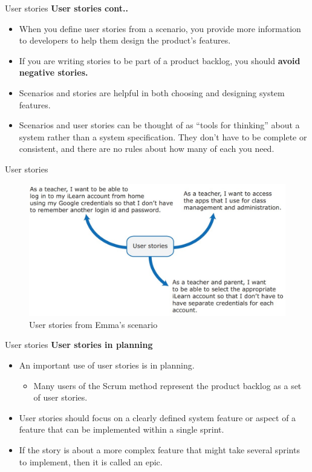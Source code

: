 \documentclass{beamer}
\begin{document}
\begin{frame}{User stories}
	\textbf{User stories cont..}
	\begin{itemize}
		\item When you define user stories from a scenario, you provide more 
		information to developers to help them design the product’s features.
		\item If you are writing stories to be part of a product backlog, you should 
	\textbf{	avoid negative stories.}
		\item Scenarios and stories are helpful in both choosing and designing 
		system features. 
		\item Scenarios and user stories can be thought of as “tools for thinking” 
		about a system rather than a system specification. They don’t have to 
		be complete or consistent, and there are no rules about how many of 
		each you need.
	\end{itemize}
\end{frame}
\begin{frame}{User stories}
		\begin{figure}
		\includegraphics[scale=.45]{img/m2_27.jpg}
		\caption{User stories from Emma’s scenario}
	\end{figure}
\end{frame}
\begin{frame}{User stories}
\textbf{User stories in planning}
\begin{itemize}
	\item An important use of user stories is in planning.
	\begin{itemize}
		\item Many users of the Scrum method represent the product backlog as a set of user stories. 
	\end{itemize}
\item User stories should focus on a clearly defined system feature or aspect of a feature that can be implemented within a single sprint. 
\item If the story is about a more complex feature that might take several sprints to implement, then it is called an epic.

\end{itemize}
\end{frame}
\end{document}
